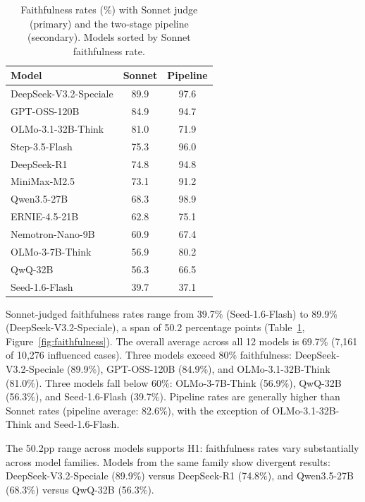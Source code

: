 \begin{table}[H]
  \centering
  \caption{Faithfulness rates (\%) with Sonnet judge (primary) and the
  two-stage pipeline (secondary). Models sorted by Sonnet faithfulness rate.}
  \label{tab:faithfulness}
  \begin{tabular}{lcc}
    \toprule
    \textbf{Model} & \textbf{Sonnet} & \textbf{Pipeline} \\
    \midrule
    DeepSeek-V3.2-Speciale & 89.9 & 97.6 \\
    GPT-OSS-120B           & 84.9 & 94.7 \\
    OLMo-3.1-32B-Think     & 81.0 & 71.9 \\
    Step-3.5-Flash         & 75.3 & 96.0 \\
    DeepSeek-R1            & 74.8 & 94.8 \\
    MiniMax-M2.5           & 73.1 & 91.2 \\
    Qwen3.5-27B            & 68.3 & 98.9 \\
    ERNIE-4.5-21B          & 62.8 & 75.1 \\
    Nemotron-Nano-9B       & 60.9 & 67.4 \\
    OLMo-3-7B-Think        & 56.9 & 80.2 \\
    QwQ-32B                & 56.3 & 66.5 \\
    Seed-1.6-Flash         & 39.7 & 37.1 \\
    \bottomrule
  \end{tabular}
\end{table}

Sonnet-judged faithfulness rates range from 39.7\% (Seed-1.6-Flash) to 89.9\% (DeepSeek-V3.2-Speciale), a span of 50.2 percentage points (Table~\ref{tab:faithfulness}, Figure~\ref{fig:faithfulness}). The overall average across all 12 models is 69.7\% (7,161 of 10,276 influenced cases). Three models exceed 80\% faithfulness: DeepSeek-V3.2-Speciale (89.9\%), GPT-OSS-120B (84.9\%), and OLMo-3.1-32B-Think (81.0\%). Three models fall below 60\%: OLMo-3-7B-Think (56.9\%), QwQ-32B (56.3\%), and Seed-1.6-Flash (39.7\%). Pipeline rates are generally higher than Sonnet rates (pipeline average: 82.6\%), with the exception of OLMo-3.1-32B-Think and Seed-1.6-Flash.

The 50.2pp range across models supports H1: faithfulness rates vary substantially across model families. Models from the same family show divergent results: DeepSeek-V3.2-Speciale (89.9\%) versus DeepSeek-R1 (74.8\%), and Qwen3.5-27B (68.3\%) versus QwQ-32B (56.3\%).

